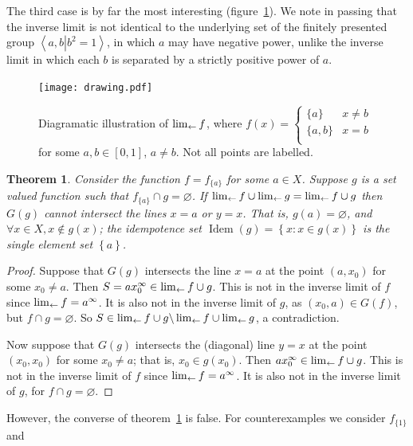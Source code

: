 \documentclass{article}
\newtheorem{thm}{Theorem}
\theoremstyle{definition}
\let\emptyset\varnothing
\begin{document}
The third case is by far the most interesting (figure~\ref{drawing}).
We note in passing that the inverse limit is not identical to the
underlying set of the finitely presented group $\left\langle
a,b\left|b^2=1\right.\right\rangle$, in which $a$ may have negative
power, unlike the inverse limit in which each $b$ is separated by a
strictly positive power of $a$.

\begin{figure}[h]
\centering
\texttt{[image: drawing.pdf]}
\caption[width=\textwidth]{Diagramatic illustration of 
  \label{drawing} $\lim_{\leftarrow} f$, where $f(x) = \begin{cases}
    \lbrace a\rbrace & x\neq b\\
    \lbrace a,b\rbrace & x=b\\
  \end{cases}$ for some $a,b\in[0,1]$, $a\neq b$.  Not all points are
  labelled.}
\end{figure}

\newcommand{\fa}{f_{\lbrace a\rbrace}}

\begin{thm}\label{fish}
Consider the function $f=\fa$ for some $a\in X$.  Suppose $g$ is a set
valued function such that $\fa\cap g=\emptyset$.  If
$\lim_{\leftarrow} f\cup\lim_{\leftarrow} g = \lim_{\leftarrow} f\cup g$ then $G(g)$ cannot
intersect the lines $x=a$ or $y=x$.  That is, $g(a)=\emptyset$, and
$\forall x\in X, x\notin g(x)$; the idempotence set
$\operatorname{Idem}(g)=\left\lbrace x\colon x\in g(x)\right\rbrace$
is the single element set $\left\lbrace a\right\rbrace$.
\end{thm}

\begin{proof}
Suppose that $G(g)$ intersects the line $x = a$ at the point $(a,x_0)$
for some $x_0\neq a$.  Then $S=ax_0^\infty\in\lim_{\leftarrow} f\cup g$.  This
is not in the inverse limit of $f$ since $\lim_{\leftarrow} f = a^\infty$.  It
is also not in the inverse limit of $g$, as $(x_0,a) \in G(f)$, but
$f\cap g=\emptyset$.  So $S\in\lim_{\leftarrow} f\cup
  g\backslash\lim_{\leftarrow} f\cup\lim_{\leftarrow} g$, a contradiction.

Now suppose that $G(g)$ intersects the (diagonal) line $y = x$ at the
point $(x_0,x_0)$ for some $x_0\neq a$; that is, $x_0\in g(x_0)$.
Then $ax_0^\infty\in \lim_{\leftarrow} f\cup g$.  This is not in the inverse
limit of $f$ since $\lim_{\leftarrow} f = a^\infty$.  It is also not in the
inverse limit of $g$, for $f\cap g=\emptyset$.  
\end{proof}


However, the converse of theorem~\ref{fish} is false.  For
counterexamples we consider $f_{\lbrace 1\rbrace}$ and
\end{document}
